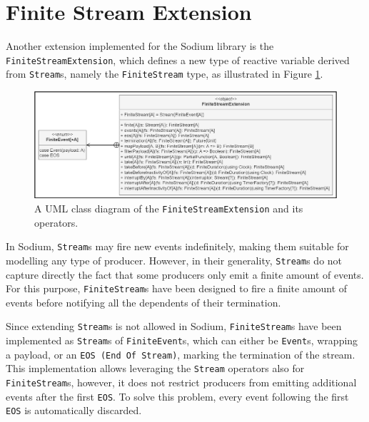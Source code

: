 
\section{Finite Stream Extension}
\label{section:implementation:finite-stream-extension}

Another extension implemented for the Sodium library is the
\texttt{FiniteStreamExten\-sion}, which defines a new type of reactive variable
derived from \texttt{Stream}s, namely the \texttt{Finite\-Stream} type, as
illustrated in Figure \ref{figure:finite-stream-extension-class-diagram}.

\begin{figure}[!ht]
  \centering
  \includegraphics[width=1\textwidth]{resources/figures/finite-stream-extension-class-diagram.png}
  \caption[A UML class diagram of the finite stream extension]{
    A UML class diagram of the \texttt{FiniteStreamExtension}
    and its operators.
  }
  \label{figure:finite-stream-extension-class-diagram}
\end{figure}

In Sodium, \texttt{Stream}s may fire new events indefinitely, making them
suitable for modelling any type of producer. However, in their generality,
\texttt{Stream}s do not capture directly the fact that some producers only emit
a finite amount of events. For this purpose, \texttt{FiniteStream}s have been
designed to fire a finite amount of events before notifying all the dependents
of their termination.

Since extending \texttt{Stream}s is not allowed in Sodium,
\texttt{FiniteStream}s have been implemented as \texttt{Stream}s of
\texttt{FiniteEvent}s, which can either be \texttt{Event}s, wrapping a payload,
or an \texttt{EOS (End Of Stream)}, marking the termination of the stream. This
implementation allows leveraging the \texttt{Stream} operators also for
\texttt{FiniteStream}s, however, it does not restrict producers from emitting
additional events after the first \texttt{EOS}. To solve this problem, every
event following the first \texttt{EOS} is automatically discarded.

